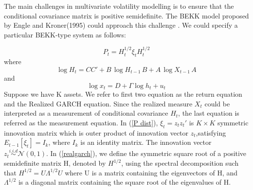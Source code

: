 \documentclass[titlepage,11pt]{article}
\begin{document}
The main challenges in multivariate volatility modelling is to ensure that the conditional covariance matrix is positive semidefinite. The BEKK model proposed by Engle and Kroner(1995) could approach this challenge .
We could specify a particular BEKK-type system as follows:


\begin{equation}
	\label{P dist}
	P_t = H_t^{1/2}\xi_t H_t^{1/2}
\end{equation}
where
\begin{equation}
	\label{realgarch}
	\log H_t=CC'+ B\, \log H_{t-1} \,B+A \, \log X_{t-1} \, A
\end{equation}
and
\begin{equation}
	\label{measurement}
	\log x_t= D+ \Gamma \log h_t+ u_t
\end{equation}
Suppose we have K assets.
We refer to first two equation as the return equation and the Realized GARCH equation. Since the realized measure $X_t$ could be interpreted as a measurement of conditional covariance $H_t$, the last equation is referred as the measurement equation.
 In (\ref{P dist}), $\xi_t = z_t z_t'$ is $K \times K$ symmetric innovation matrix which is outer product of innovation vector $z_t$,satisfying $E_{t-1}[\xi_t]=I_k$, where $I_k$ is an identity matrix. The innovation vector $z_t \overset{i.i.d} {\sim} \mathcal{N}(0,1)$. 
In (\ref{realgarch}), we define the symmetric square root of a positive semidefinite matrix H, denoted by $H^{1/2}$, using the spectral decomposition such that $H^{1/2} = U \Lambda^{1/2} U$ where U is a matrix containing the eigenvectors of H, and $\Lambda^{1/2}$ is a diagonal matrix containing the square root of the eigenvalues of H.
\end{document}
